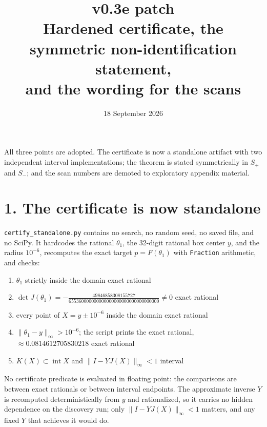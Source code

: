 \documentclass[11pt]{article}
\title{\textbf{v0.3e patch}\\[2pt]
\large Hardened certificate, the symmetric non-identification statement,\\ and the wording for the scans}
\author{18 September 2026}
\date{}
\theoremstyle{remark}
\begin{document}
\maketitle
\vspace{-2.5em}

All three points are adopted. The certificate is now a standalone artifact with two independent interval implementations; the theorem is stated symmetrically in $S_+$ and $S_-$; and the scan numbers are demoted to exploratory appendix material.

\section*{1. The certificate is now standalone}

\texttt{certify\_standalone.py} contains no search, no random seed, no saved file, and no SciPy. It hardcodes the rational $\theta_1$, the 32-digit rational box center $y$, and the radius $10^{-6}$, recomputes the exact target $p=F(\theta_1)$ with \texttt{Fraction} arithmetic, and checks:
\begin{enumerate}[label=(C\arabic*)]
\item $\theta_1$ strictly inside the domain \hfill exact rational
\item $\det J(\theta_1)=-\tfrac{49846858308155727}{655360000000000000000000000000000000}\neq0$ \hfill exact rational
\item every point of $X=y\pm10^{-6}$ inside the domain \hfill exact rational
\item $\|\theta_1-y\|_\infty>10^{-6}$; the script prints the exact rational, $\approx0.0814612705830218$ \hfill exact rational
\item $K(X)\subset\operatorname{int}X$ and $\|I-YJ(X)\|_\infty<1$ \hfill interval
\end{enumerate}
No certificate predicate is evaluated in floating point: the comparisons are between exact rationals or between interval endpoints. The approximate inverse $Y$ is recomputed deterministically from $y$ and rationalized, so it carries no hidden dependence on the discovery run; only $\|I-YJ(X)\|_\infty<1$ matters, and any fixed $Y$ that achieves it would do.
\end{document}
